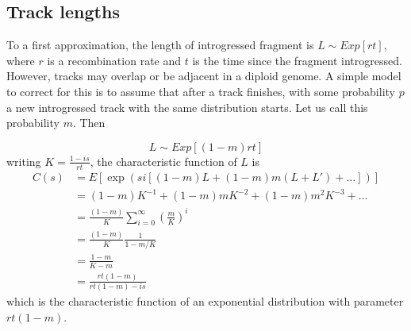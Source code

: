 \documentclass[10pt,a4paper]{article}
\begin{document}
\subsection{Track lengths}
To a first approximation, the length of introgressed fragment is 
$L \sim Exp[r t ]$, where $r$ is a recombination rate and $t$ is the time since the fragment introgressed. However, tracks may overlap or be adjacent in a diploid genome. A simple model to correct for this is to assume that after a track finishes, with some probability $p$ a new introgressed track with the same distribution starts. Let us call this probability $m$. Then

\begin{equation}
L \sim Exp[(1-m)rt]
\end{equation}
writing $K = \frac{1-is}{rt}$, the characteristic function of $L$ is
\begin{align}
C(s) &= E[\exp(si [(1-m)L + (1-m)m (L+L')+ \dots  ] )]\nonumber\\
&=(1-m) K^{-1} + (1-m)m K^{-2} +(1-m)m^2 K^{-3} + \dots\nonumber\\
&=\frac{(1-m)}{K} \sum_{i=0}^\infty \left(\frac{m}{K}\right)^{i} \nonumber\\
&= \frac{(1-m)}{K} \frac{1}{1 - m/K}\nonumber\\
&= \frac{1-m}{K-m}\nonumber\\
&= \frac{rt(1-m)}{rt (1-m) - is}\nonumber
\end{align}
which is the characteristic function of an exponential distribution with parameter $rt(1-m)$.
\end{document}
